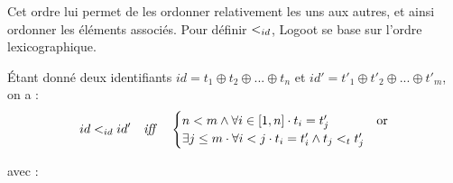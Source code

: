 \begin{itemize}
    Cet ordre lui permet de les ordonner relativement les uns aux autres, et ainsi ordonner les éléments associés.
    Pour définir $<_{id}$, Logoot se base sur l'ordre lexicographique.
    \begin{definition}
      Étant donné deux identifiants $id = t_1 \oplus t_2 \oplus ... \oplus t_n$ et $id' = t'_1 \oplus t'_2 \oplus ... \oplus t'_m$, on a :
        \[
          id <_{id} id' \quad \mathit{iff} \quad
          \begin{cases}
            n < m \land \forall i \in [1,n] \cdot t_i = t'_j                                   & \text{or} \\
            \exists j \leq m \cdot \forall i < j \cdot t_i = t'_i \land t_j <_{t} t'_j &           \\
          \end{cases}
        \]
    \end{definition}

    avec :


\end{itemize}
